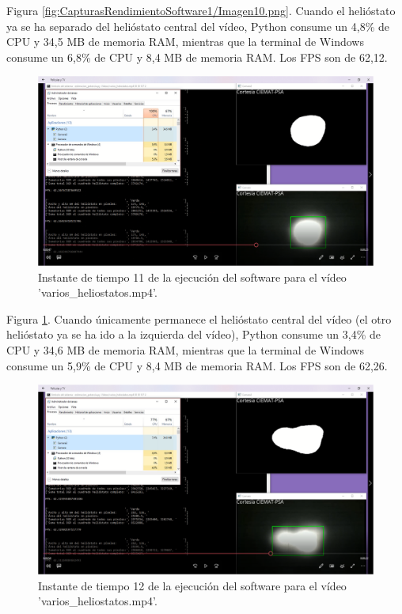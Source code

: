 Figura \ref{fig:CapturasRendimientoSoftware1/Imagen10.png}. Cuando el helióstato ya se ha separado del helióstato central del vídeo, Python consume un 4,8\% de CPU y 34,5 MB de memoria RAM, mientras que la terminal de Windows consume un 6,8\% de CPU y 8,4 MB de memoria RAM. Los FPS son de 62,12.

\begin{figure}[h!]
  	\centering
	\includegraphics[width=\textwidth]{CapturasRendimientoSoftware1/Imagen11.png}
	\caption{Instante de tiempo 11 de la ejecución del software para el vídeo 'varios\_heliostatos.mp4'.
	\label{fig:CapturasRendimientoSoftware1/Imagen11.png}}
\end{figure}

Figura \ref{fig:CapturasRendimientoSoftware1/Imagen11.png}. Cuando únicamente permanece el helióstato central del vídeo (el otro helióstato ya se ha ido a la izquierda del vídeo), Python consume un 3,4\% de CPU y 34,6 MB de memoria RAM, mientras que la terminal de Windows consume un 5,9\% de CPU y 8,4 MB de memoria RAM. Los FPS son de 62,26.

\begin{figure}[h!]
  	\centering
	\includegraphics[width=\textwidth]{CapturasRendimientoSoftware1/Imagen12.png}
	\caption{Instante de tiempo 12 de la ejecución del software para el vídeo 'varios\_heliostatos.mp4'.
	\label{fig:CapturasRendimientoSoftware1/Imagen12.png}}
\end{figure}

